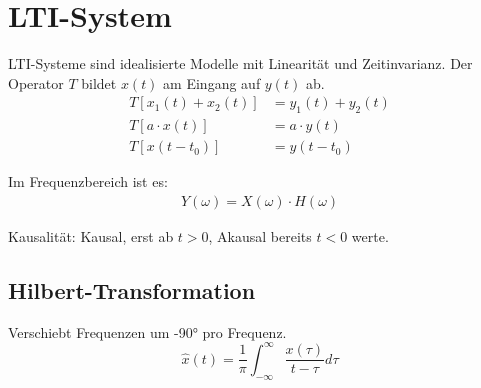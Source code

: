 \section{LTI-System}
LTI-Systeme sind idealisierte Modelle mit Linearität und Zeitinvarianz. Der Operator $T$ bildet $x(t)$ am Eingang auf $y(t)$ ab.
\begin{align*}
	T[x_1(t) + x_2(t)] &= y_1(t) + y_2(t) \\
	T[a\cdot x(t)] &= a\cdot y(t) \\
	T[x(t - t_0)] &= y(t- t_0)
\end{align*}

Im Frequenzbereich ist es:
\begin{align*}
	Y(\omega) = X(\omega) \cdot H(\omega)
\end{align*}


Kausalität: Kausal, erst ab $t > 0$, Akausal bereits $t < 0$ werte.

\subsection{Hilbert-Transformation}
Verschiebt Frequenzen um -90° pro Frequenz. 
\[
\hat{x}(t) = \frac{1}{\pi}\int_{-\infty}^{\infty}\frac{x(\tau)}{t - \tau}d\tau
\]